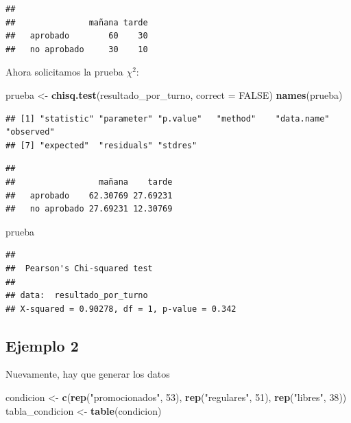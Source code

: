 \documentclass[]{book}
\newenvironment{Shaded}{\begin{snugshade}}{\end{snugshade}}
\newcommand{\DataTypeTok}[1]{\textcolor[rgb]{0.13,0.29,0.53}{#1}}
\newcommand{\DecValTok}[1]{\textcolor[rgb]{0.00,0.00,0.81}{#1}}
\newcommand{\KeywordTok}[1]{\textcolor[rgb]{0.13,0.29,0.53}{\textbf{#1}}}
\newcommand{\NormalTok}[1]{#1}
\newcommand{\OperatorTok}[1]{\textcolor[rgb]{0.81,0.36,0.00}{\textbf{#1}}}
\newcommand{\OtherTok}[1]{\textcolor[rgb]{0.56,0.35,0.01}{#1}}
\newcommand{\StringTok}[1]{\textcolor[rgb]{0.31,0.60,0.02}{#1}}
\begin{document}
\begin{verbatim}
##              
##               mañana tarde
##   aprobado        60    30
##   no aprobado     30    10
\end{verbatim}

Ahora solicitamos la prueba \(\chi^2\):

\begin{Shaded}
\begin{Highlighting}[]
\NormalTok{prueba <-}\StringTok{ }\KeywordTok{chisq.test}\NormalTok{(resultado_por_turno, }\DataTypeTok{correct =} \OtherTok{FALSE}\NormalTok{)}
\KeywordTok{names}\NormalTok{(prueba)}
\end{Highlighting}
\end{Shaded}

\begin{verbatim}
## [1] "statistic" "parameter" "p.value"   "method"    "data.name" "observed" 
## [7] "expected"  "residuals" "stdres"
\end{verbatim}

\begin{Shaded}
\end{Shaded}

\begin{verbatim}
##              
##                 mañana    tarde
##   aprobado    62.30769 27.69231
##   no aprobado 27.69231 12.30769
\end{verbatim}

\begin{Shaded}
\begin{Highlighting}[]
\NormalTok{prueba}
\end{Highlighting}
\end{Shaded}

\begin{verbatim}
## 
##  Pearson's Chi-squared test
## 
## data:  resultado_por_turno
## X-squared = 0.90278, df = 1, p-value = 0.342
\end{verbatim}

\hypertarget{ejemplo-2}{%
\subsection{Ejemplo 2}\label{ejemplo-2}}

Nuevamente, hay que generar los datos

\begin{Shaded}
\begin{Highlighting}[]
\NormalTok{condicion <-}\StringTok{ }\KeywordTok{c}\NormalTok{(}\KeywordTok{rep}\NormalTok{(}\StringTok{"promocionados"}\NormalTok{, }\DecValTok{53}\NormalTok{), }\KeywordTok{rep}\NormalTok{(}\StringTok{"regulares"}\NormalTok{, }\DecValTok{51}\NormalTok{), }\KeywordTok{rep}\NormalTok{(}\StringTok{"libres"}\NormalTok{, }\DecValTok{38}\NormalTok{))}
\NormalTok{tabla_condicion <-}\StringTok{ }\KeywordTok{table}\NormalTok{(condicion)}
\end{Highlighting}
\end{Shaded}
\end{document}
